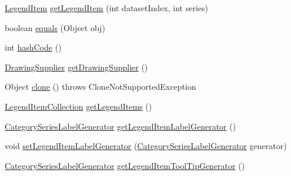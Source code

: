 \begin{DoxyCompactItemize}
\item 
\mbox{\hyperlink{classorg_1_1jfree_1_1chart_1_1_legend_item}{Legend\+Item}} \mbox{\hyperlink{classorg_1_1jfree_1_1chart_1_1renderer_1_1category_1_1_abstract_category_item_renderer_a7a86e8d71b7d79ed228580497ac39dca}{get\+Legend\+Item}} (int dataset\+Index, int series)
\item 
boolean \mbox{\hyperlink{classorg_1_1jfree_1_1chart_1_1renderer_1_1category_1_1_abstract_category_item_renderer_ab034da4928eab9ba6af82a60062a560f}{equals}} (Object obj)
\item 
int \mbox{\hyperlink{classorg_1_1jfree_1_1chart_1_1renderer_1_1category_1_1_abstract_category_item_renderer_ad20cb3cd11aac243c3ca77b6e5f5fca6}{hash\+Code}} ()
\item 
\mbox{\hyperlink{interfaceorg_1_1jfree_1_1chart_1_1plot_1_1_drawing_supplier}{Drawing\+Supplier}} \mbox{\hyperlink{classorg_1_1jfree_1_1chart_1_1renderer_1_1category_1_1_abstract_category_item_renderer_a4c84227b5560e04f4b36f83b5ee837db}{get\+Drawing\+Supplier}} ()
\item 
Object \mbox{\hyperlink{classorg_1_1jfree_1_1chart_1_1renderer_1_1category_1_1_abstract_category_item_renderer_a1b853bdddd2e85f81566e971292d9e78}{clone}} ()  throws Clone\+Not\+Supported\+Exception 
\item 
\mbox{\hyperlink{classorg_1_1jfree_1_1chart_1_1_legend_item_collection}{Legend\+Item\+Collection}} \mbox{\hyperlink{classorg_1_1jfree_1_1chart_1_1renderer_1_1category_1_1_abstract_category_item_renderer_a64baac5b575af71d3dfd90791764c1a9}{get\+Legend\+Items}} ()
\item 
\mbox{\hyperlink{interfaceorg_1_1jfree_1_1chart_1_1labels_1_1_category_series_label_generator}{Category\+Series\+Label\+Generator}} \mbox{\hyperlink{classorg_1_1jfree_1_1chart_1_1renderer_1_1category_1_1_abstract_category_item_renderer_a09bd5701cd60505b3463b9e59a3ae70a}{get\+Legend\+Item\+Label\+Generator}} ()
\item 
void \mbox{\hyperlink{classorg_1_1jfree_1_1chart_1_1renderer_1_1category_1_1_abstract_category_item_renderer_a59531e6a6ddc6c69540765b7d4e9a451}{set\+Legend\+Item\+Label\+Generator}} (\mbox{\hyperlink{interfaceorg_1_1jfree_1_1chart_1_1labels_1_1_category_series_label_generator}{Category\+Series\+Label\+Generator}} generator)
\item 
\mbox{\hyperlink{interfaceorg_1_1jfree_1_1chart_1_1labels_1_1_category_series_label_generator}{Category\+Series\+Label\+Generator}} \mbox{\hyperlink{classorg_1_1jfree_1_1chart_1_1renderer_1_1category_1_1_abstract_category_item_renderer_a076a55b31cb3f6bcbbb16a0ac0df2f15}{get\+Legend\+Item\+Tool\+Tip\+Generator}} ()

\end{DoxyCompactItemize}
